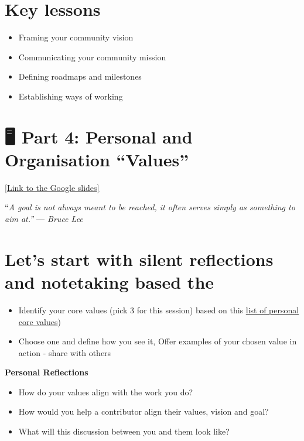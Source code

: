 \documentclass[
  letterpaper,
  DIV=11,
  numbers=noendperiod]{scrreport}
\providecommand{\tightlist}{%
  \setlength{\itemsep}{0pt}\setlength{\parskip}{0pt}}\usepackage{longtable,booktabs,array}
\begin{document}
\hypertarget{key-lessons-3}{%
\section{Key lessons}\label{key-lessons-3}}

\begin{itemize}
\tightlist
\item
  Framing your community vision
\item
  Communicating your community mission
\item
  Defining roadmaps and milestones
\item
  Establishing ways of working
\end{itemize}

\hypertarget{part-4-personal-and-organisation-values}{%
\section{🖥 Part 4: Personal and Organisation
``Values''}\label{part-4-personal-and-organisation-values}}

\href{https://docs.google.com/presentation/d/1JZt3HQMKg_6Eu3ctHH3PUv-9LgdTwFpyYhkrOwf5AUs/edit?usp=sharing}{{[}Link
to the Google slides{]}}

``\emph{A goal is not always meant to be reached, it often serves simply
as something to aim at.'' ― Bruce Lee}

\hypertarget{lets-start-with-silent-reflections-and-notetaking-based-the}{%
\section{Let's start with silent reflections and notetaking based
the}\label{lets-start-with-silent-reflections-and-notetaking-based-the}}

\begin{itemize}
\tightlist
\item
  Identify your core values (pick 3 for this session) based on this
  \href{https://thehappinessplanner.co.uk/pages/list-of-core-values}{list
  of personal core values})
\item
  Choose one and define how you see it, Offer examples of your chosen
  value in action - share with others
\end{itemize}

\textbf{Personal Reflections}

\begin{itemize}
\tightlist
\item
  How do your values align with the work you do?
\item
  How would you help a contributor align their values, vision and goal?
\item
  What will this discussion between you and them look like?
\end{itemize}
\end{document}

